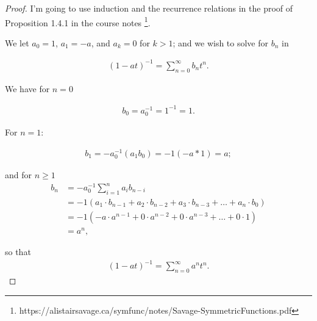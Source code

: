 \documentclass[12pt]{extarticle}
\newcommand{\<}{\langle}
\renewcommand{\>}{\rangle}
\theoremstyle{definition}
\begin{document}
\begin{proof}
  I'm going to use induction and the recurrence relations in the proof of Proposition 1.4.1 in the course notes \footnote{https://alistairsavage.ca/symfunc/notes/Savage-SymmetricFunctions.pdf}.

  We let $a_0 = 1$, $a_1 = -a$, and $a_k = 0$ for $k > 1$; and we wish to solve for $b_n$ in 

  \begin{align*}
    (1-at)^{-1} = \sum\limits_{n=0}^{\infty} b_n t^n.
  \end{align*}

  We have for $n=0$

  \begin{align*}
    b_0 = a_0^{-1}= 1^{-1} = 1.
  \end{align*}

  For $n=1$:


  \begin{align*}
    b_1 = -a_0^{-1}(a_1 b_0) = -1 (-a*1) = a;
  \end{align*}

  and for $n \geq 1$
  \begin{align*}
    b_n
    &= -a_0^{-1}\sum\limits_{i=1}^n a_i b_{n-i} \\
    &= -1 (a_1\cdot b_{n-1} + a_2 \cdot b_{n-2} + a_3 \cdot b_{n-3} + \dots + a_n \cdot b_0) \\
    &= -1 (-a \cdot a^{n-1} + 0 \cdot a^{n-2} + 0 \cdot a^{n-3} + \dots + 0 \cdot1) \\
    &= a^n,
  \end{align*}

  so that
    \begin{align*}
    (1-at)^{-1} = \sum\limits_{n=0}^{\infty} a^n t^n.
  \end{align*}

\end{proof}
\end{document}
